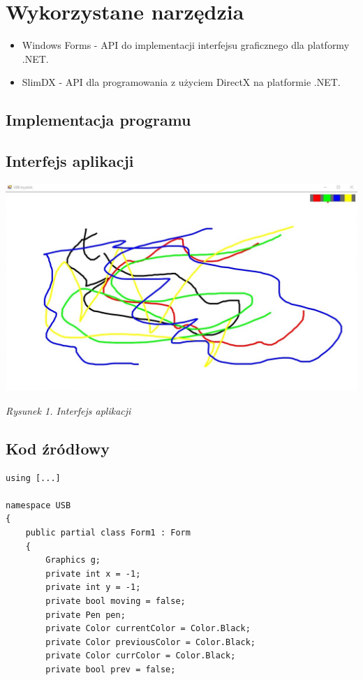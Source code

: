 \documentclass[12pt,a4paper,notitlepage]{report}
\begin{document}
\section{Wykorzystane narzędzia}
\begin{itemize}
\item Windows Forms - API do implementacji interfejsu graficznego dla platformy .NET.
\item SlimDX - API dla programowania z użyciem DirectX na platformie .NET.
\end{itemize}
\begin{adjustwidth}{0pt}{-50pt}
\section{Implementacja programu}
\subsection{Interfejs aplikacji}
\begin{center}
\noindent \includegraphics[scale=0.45]{okno}
\\
\begin{normalsize}
\textit{Rysunek 1. Interfejs aplikacji}
\end{normalsize}
\end{center}
\subsection{Kod źródłowy}
\begin{lstlisting}
using [...]

namespace USB
{
    public partial class Form1 : Form
    {
        Graphics g;
        private int x = -1;
        private int y = -1;
        private bool moving = false;
        private Pen pen;
        private Color currentColor = Color.Black;
        private Color previousColor = Color.Black;
        private Color currColor = Color.Black;
        private bool prev = false;
        

\end{lstlisting}
\end{adjustwidth}
\end{document}
